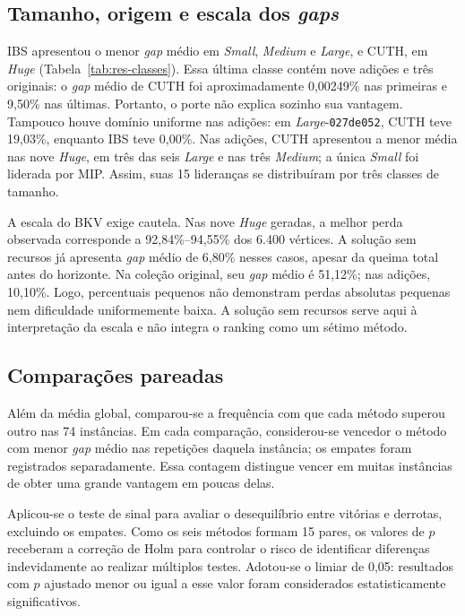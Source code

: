 \subsection{Tamanho, origem e escala dos \textit{gaps}}

IBS apresentou o menor \textit{gap} médio em \textit{Small},
\textit{Medium} e \textit{Large}, e CUTH, em \textit{Huge}
(Tabela~\ref{tab:res-classes}). Essa última classe contém nove adições e
três originais: o \textit{gap} médio de CUTH foi aproximadamente 0,00249\%
nas primeiras e 9,50\% nas últimas. Portanto, o porte não explica sozinho
sua vantagem. Tampouco houve domínio uniforme nas adições: em
\textit{Large}-\texttt{027de052}, CUTH teve 19,03\%, enquanto IBS teve 0,00\%.
Nas adições, CUTH apresentou a menor média nas nove \textit{Huge},
em três das seis \textit{Large} e nas três \textit{Medium}; a única
\textit{Small} foi liderada por MIP. Assim, suas 15 lideranças se
distribuíram por três classes de tamanho.



A escala do BKV exige cautela. Nas nove \textit{Huge} geradas, a melhor
perda observada corresponde a 92,84\%--94,55\% dos 6.400 vértices.
A solução sem recursos já apresenta \textit{gap} médio de 6,80\% nesses
casos, apesar da queima total antes do horizonte. Na coleção original,
seu \textit{gap} médio é 51,12\%; nas adições, 10,10\%. Logo, percentuais
pequenos não demonstram perdas absolutas pequenas nem dificuldade
uniformemente baixa. A solução sem recursos serve aqui à interpretação
da escala e não integra o ranking como um sétimo método.

\subsection{Comparações pareadas}

Além da média global, comparou-se a frequência com que cada método
superou outro nas 74 instâncias. Em cada comparação, considerou-se vencedor
o método com menor \textit{gap} médio nas repetições daquela instância;
os empates foram registrados separadamente. Essa contagem distingue vencer
em muitas instâncias de obter uma grande vantagem em poucas delas.

Aplicou-se o teste de sinal para avaliar o desequilíbrio entre vitórias
e derrotas, excluindo os empates. Como os seis métodos formam 15 pares,
os valores de $p$ receberam a correção de Holm para controlar o risco de
identificar diferenças indevidamente ao realizar múltiplos testes.
Adotou-se o limiar de 0,05: resultados com $p$ ajustado menor ou igual
a esse valor foram considerados estatisticamente significativos.

